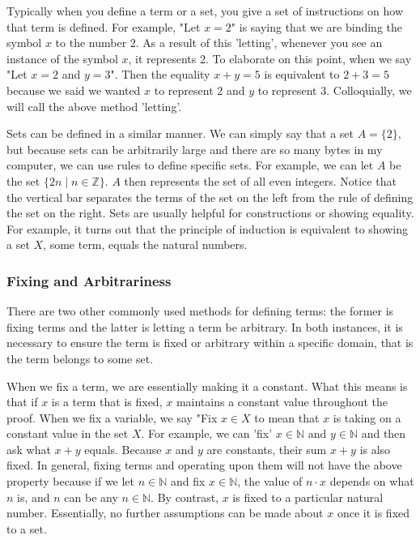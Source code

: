 \documentclass[12pt]{book}
\def\N{{\mathbb{N}}}
\def\Z{{\mathbb{Z}}}
\begin{document}
	Typically when you define a term or a set, you give a set of instructions on how that term is defined. For example, "Let $x=2$" is saying that we are binding the symbol $x$ to the number 2. As a result of this 'letting', whenever you see an instance of the symbol $x$, it represents 2. To elaborate on this point, when we say "Let $x=2$ and $y=3$". Then the equality $x+y=5$ is equivalent to $2+3=5$ because we said we wanted $x$ to represent 2 and $y$ to represent 3. Colloquially, we will call the above method 'letting'.

	Sets can be defined in a similar manner. We can simply say that a set $A=\{2\}$, but because sets can be arbitrarily large and there are so many bytes in my computer, we can use rules to define specific sets. For example, we can let $A$ be the set $\{2n\mid n\in\Z\}$. $A$ then represents the set of all even integers. Notice that the vertical bar separates the terms of the set on the left from the rule of defining the set on the right. Sets are usually helpful for constructions or showing equality. For example, it turns out that the principle of induction is equivalent to showing a set $X$, some term, equals the natural numbers.
	
\subsubsection*{Fixing and Arbitrariness}

	There are two other commonly used methods for defining terms: the former is fixing terms and the latter is letting a term be arbitrary. In both instances, it is necessary to ensure the term is fixed or arbitrary within a specific domain, that is the term belongs to some set.

	When we fix a term, we are essentially making it a constant. What this means is that if $x$ is a term that is fixed, $x$ maintains a constant value throughout the proof. When we fix a variable, we say "Fix $x\in X$ to mean that $x$ is taking on a constant value in the set $X$. For example, we can 'fix' $x\in\N$ and $y\in\N$ and then ask what $x+y$ equals. Because $x$ and $y$ are constants, their sum $x+y$ is also fixed. In general, fixing terms and operating upon them will not have the above property because if we let $n\in\N$ and fix $x\in\N$, the value of $n\cdot x$ depends on what $n$ is, and $n$ can be any $n\in\N$. By contrast, $x$ is fixed to a particular natural number. Essentially, no further assumptions can be made about $x$ once it is fixed to a set.
\end{document}
